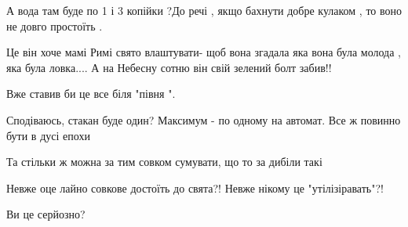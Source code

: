 \begin{itemize}
А вода там буде по 1 і 3 копійки ?До речі , якщо бахнути добре кулаком , то
воно не довго простоїть .


 

Це він хоче мамі Римі свято влаштувати- щоб вона згадала яка вона була молода ,
яка була ловка.... А на Небесну сотню він свій зелений болт забив!!


 
Вже ставив би це все біля "півня ".

 
Сподіваюсь, стакан буде один? Максимум - по одному на автомат. Все ж повинно
бути в дусі епохи

 
Та стільки ж можна за тим совком сумувати, що то за дибіли такі

 
Невже оце лайно совкове достоїть до свята?! Невже нікому це "утілізіравать"?!

 
Ви це серйозно?


\end{itemize}
